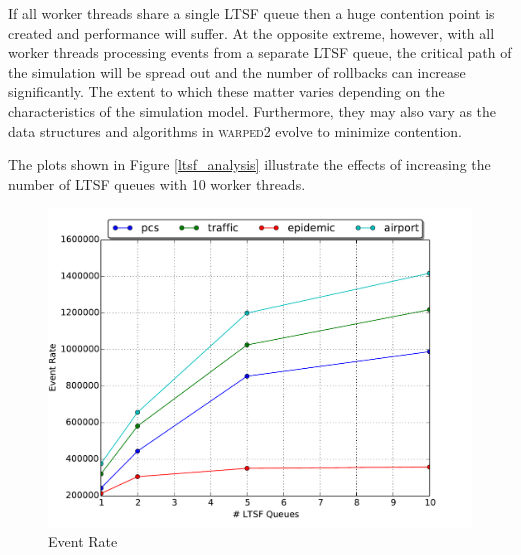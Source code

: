 \documentclass[11pt]{book}
\begin{document}
If all worker threads share a single LTSF queue then a huge contention point is created and
performance will suffer.  At the opposite extreme, however, with all worker threads processing
events from a separate LTSF queue, the critical path of the simulation will be spread out and
the number of rollbacks can increase significantly.  The extent to which these matter varies
depending on the characteristics of the simulation model.  Furthermore, they may also vary as the
data structures and algorithms in \textsc{warped2} evolve to minimize contention.

The plots shown in Figure \ref{ltsf_analysis} illustrate the effects of increasing the number of
LTSF queues with 10 worker threads.

\begin{figure}
  \begin{minipage}{.5\textwidth}
    \begin{center}
      \includegraphics[width=\textwidth,keepaspectratio,quiet]{figs/pending_event_set/ltsf_event_rate.pdf} \\
      Event Rate \\
    \end{center}
  \end{minipage}%
  \hfill
  \begin{minipage}{.5\textwidth}
    \begin{center}

\end{center}
\end{minipage}
\end{figure}
\end{document}
